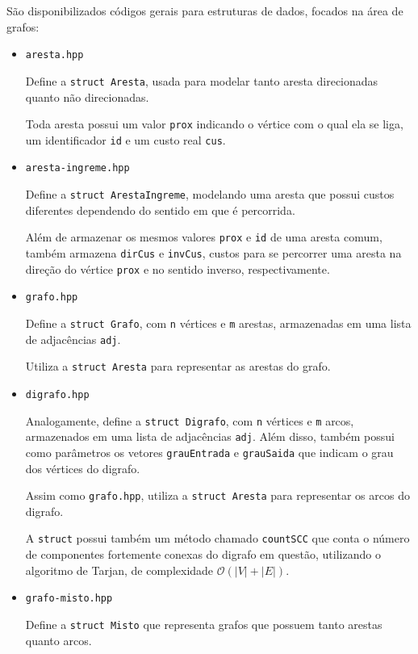 São disponibilizados códigos gerais para estruturas de dados, focados na área de grafos:
\begin{itemize}
    \item \texttt{aresta.hpp} 

        Define a \texttt{struct Aresta}, usada para modelar tanto aresta direcionadas quanto não direcionadas.

    Toda aresta possui um valor  \texttt{prox} indicando o vértice com o qual ela se liga, um identificador \texttt{id} e um custo real \texttt{cus}.
    \item \texttt{aresta-ingreme.hpp}

        Define a \texttt{struct ArestaIngreme}, modelando uma aresta que possui custos diferentes dependendo do sentido em que é percorrida.

        Além de armazenar os mesmos valores \texttt{prox} e \texttt{id} de uma aresta comum, também armazena \texttt{dirCus} e \texttt{invCus}, custos para se percorrer uma aresta na direção do vértice \texttt{prox} e no sentido inverso, respectivamente.

    \item \texttt{grafo.hpp} 
        
        Define a \texttt{struct Grafo}, com \texttt{n} vértices e \texttt{m} arestas, armazenadas em uma lista de adjacências \texttt{adj}.

        Utiliza a \texttt{struct Aresta} para representar as arestas do grafo.

    \item \texttt{digrafo.hpp}

        Analogamente, define a \texttt{struct Digrafo}, com \texttt{n} vértices e \texttt{m} arcos, armazenados em uma lista de adjacências \texttt{adj}.
        Além disso, também possui como parâmetros os vetores \texttt{grauEntrada} e \texttt{grauSaida} que indicam o grau dos vértices do digrafo.

        Assim como \texttt{grafo.hpp}, utiliza a \texttt{struct Aresta} para representar os arcos do digrafo.

        A \texttt{struct} possui também um método chamado \texttt{countSCC} que conta o número de componentes fortemente conexas do digrafo em questão, utilizando o algoritmo de Tarjan, de complexidade $\mathcal{O}(|V| + |E|)$.


    \item \texttt{grafo-misto.hpp}

        Define a \texttt{struct Misto} que representa grafos que possuem tanto arestas quanto arcos. 


\end{itemize}
